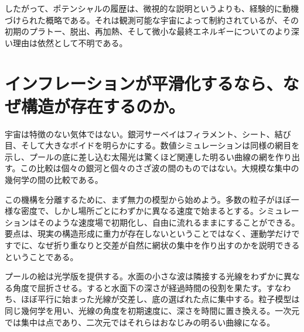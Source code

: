 \begin{classroomqa}
\end{classroomqa}

したがって、ポテンシャルの履歴は、微視的な説明というよりも、経験的に動機づけられた概略である。それは観測可能な宇宙によって制約されているが、その初期のプラトー、脱出、再加熱、そして微小な最終エネルギーについてのより深い理由は依然として不明である。

\section{インフレーションが平滑化するなら、なぜ構造が存在するのか。}

宇宙は特徴のない気体ではない。銀河サーベイはフィラメント、シート、結び目、そして大きなボイドを明らかにする。数値シミュレーションは同様の網目を示し、プールの底に差し込む太陽光は驚くほど関連した明るい曲線の網を作り出す。この比較は個々の銀河と個々のさざ波の間のものではない。大規模な集中の幾何学の間の比較である。

この機構を分離するために、まず無力の模型から始めよう。多数の粒子がほぼ一様な密度で、しかし場所ごとにわずかに異なる速度で始まるとする。シミュレーションはそのような速度場で初期化し、自由に流れるままにすることができる。要点は、現実の構造形成に重力が存在しないということではなく、運動学だけですでに、なぜ折り重なりと交差が自然に網状の集中を作り出すのかを説明できるということである。

\begin{classroomqa}
\end{classroomqa}

プールの絵は光学版を提供する。水面の小さな波は隣接する光線をわずかに異なる角度で屈折させる。すると水面下の深さが経過時間の役割を果たす。すなわち、ほぼ平行に始まった光線が交差し、底の選ばれた点に集中する。粒子模型は同じ幾何学を用い、光線の角度を初期速度に、深さを時間に置き換える。一次元では集中は点であり、二次元ではそれらはおなじみの明るい曲線になる。

